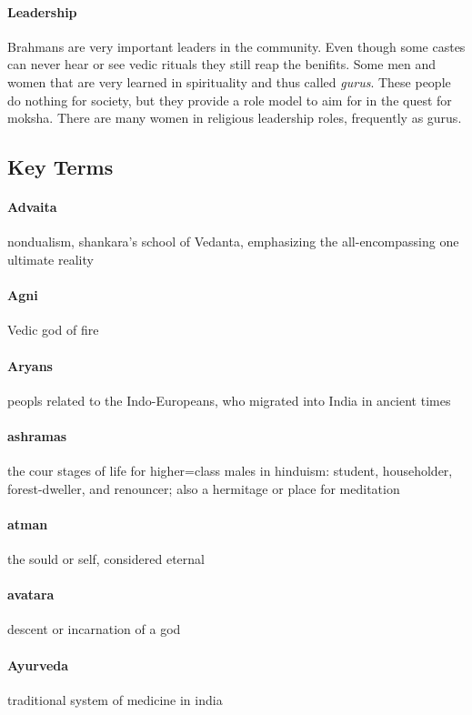 \documentclass{article}
\begin{document}
\paragraph{Leadership}
\label{par:leadership}
Brahmans are very important leaders in the community. Even though some castes can never hear or see vedic rituals they still reap the benifits. Some men and women that are very learned in spirituality and thus called \emph{gurus}. These people do nothing for society, but they provide a role model to aim for in the quest for moksha. There are many women in religious leadership roles, frequently as gurus.


\subsection*{Key Terms}
\label{sub:key_terms}
\paragraph{Advaita}
\label{par:advaita}
nondualism, shankara's school of Vedanta, emphasizing the all-encompassing one ultimate reality
\paragraph{Agni}
\label{par:agni}
Vedic god of fire
\paragraph{Aryans}
\label{par:aryans}
peopls related to the Indo-Europeans, who migrated into India in ancient times
\paragraph{ashramas}
\label{par:ashramas}
the cour stages of life for higher=class males in hinduism: student, householder, forest-dweller, and renouncer; also a hermitage or place for meditation
\paragraph{atman}
\label{par:atman}
the sould or self, considered eternal
\paragraph{avatara}
\label{par:avatara}
descent or incarnation of a god
\paragraph{Ayurveda}
\label{par:ayurveda}
traditional system of medicine in india
\end{document}
